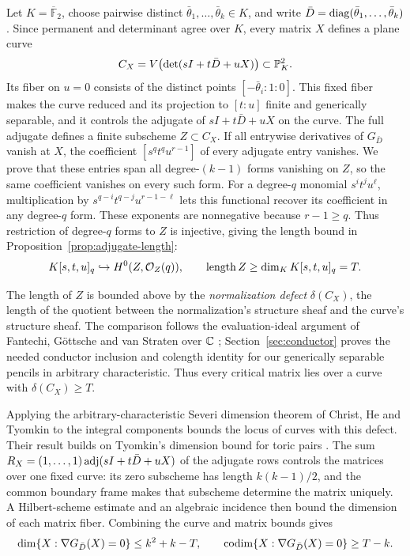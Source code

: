 Let $K=\overline{\mathbb F}_2$, choose pairwise distinct
$\bar\theta_1,\ldots,\bar\theta_k\in K$, and write
$\bar D=\operatorname{diag}(\bar\theta_1,\ldots,\bar\theta_k)$. Since permanent
and determinant agree over $K$, every matrix $X$ defines a plane curve
\[
 C_X=V\bigl(\det(sI+t\bar D+uX)\bigr)\subset\mathbb P^2_K.
\]
Its fiber on $u=0$ consists of the distinct points
$[-\bar\theta_i:1:0]$. This fixed fiber makes the curve reduced and its
projection to $[t:u]$ finite and generically separable, and it controls the adjugate
of $sI+t\bar D+uX$ on the curve. The full adjugate defines a finite
subscheme $Z\subset C_X$. If all entrywise derivatives of $G_{\bar D}$
vanish at $X$, the coefficient $[s^qt^qu^{r-1}]$ of every adjugate entry
vanishes. We prove that these
entries span all degree-$(k-1)$ forms vanishing on $Z$, so the same
coefficient vanishes on every such form. For a degree-$q$ monomial
$s^it^ju^\ell$, multiplication by $s^{q-i}t^{q-j}u^{r-1-\ell}$ lets this
functional recover its coefficient in any degree-$q$ form. These exponents
are nonnegative because $r-1\ge q$. Thus restriction of degree-$q$ forms to $Z$ is
injective, giving the length bound in Proposition~\ref{prop:adjugate-length}:
\[
 K[s,t,u]_q\hookrightarrow H^0(Z,\mathcal O_Z(q)),
 \qquad \operatorname{length} Z\ge\dim_K K[s,t,u]_q=T.
\]

The length of $Z$ is bounded above by the \emph{normalization defect}
$\delta(C_X)$, the length of the quotient between the normalization's
structure sheaf and the curve's structure sheaf. The comparison follows
the evaluation-ideal argument of Fantechi, G\"ottsche and van Straten
over $\mathbb C$ \cite[Proposition~C.2 and Corollary~C.3]{FGvS1999};
Section~\ref{sec:conductor} proves the needed conductor inclusion and
colength identity for our generically separable pencils in arbitrary
characteristic.
Thus every critical matrix lies over a curve with $\delta(C_X)\ge T$.

Applying the arbitrary-characteristic Severi dimension theorem of Christ,
He and Tyomkin \cite[Lemma~2.6, Proposition~2.7, and Remark~2.8]{CHT2023}
to the integral components bounds the locus of curves with this defect.
Their result builds on Tyomkin's dimension bound for toric pairs
\cite[Theorem~1.2(1)]{Tyomkin2013}. The sum
$R_X=(1,\ldots,1)\operatorname{adj}(sI+t\bar D+uX)$ of the adjugate rows controls
the matrices over one fixed curve: its zero subscheme has length
$k(k-1)/2$, and the common
boundary frame makes that subscheme determine the matrix uniquely.
A Hilbert-scheme estimate and an algebraic incidence then bound the
dimension of each matrix fiber. Combining the curve and matrix bounds gives
\[
 \dim\{X:\nabla G_{\bar D}(X)=0\}\le k^2+k-T,
 \qquad
 \operatorname{codim}\{X:\nabla G_{\bar D}(X)=0\}\ge T-k.
\]


